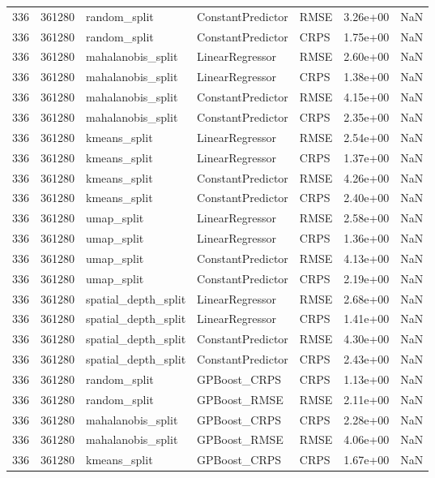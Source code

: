 \begin{tabular}{rrlllrr}
336 & 361280 & random\_split & ConstantPredictor & RMSE & 3.26e+00 & NaN \\
336 & 361280 & random\_split & ConstantPredictor & CRPS & 1.75e+00 & NaN \\
336 & 361280 & mahalanobis\_split & LinearRegressor & RMSE & 2.60e+00 & NaN \\
336 & 361280 & mahalanobis\_split & LinearRegressor & CRPS & 1.38e+00 & NaN \\
336 & 361280 & mahalanobis\_split & ConstantPredictor & RMSE & 4.15e+00 & NaN \\
336 & 361280 & mahalanobis\_split & ConstantPredictor & CRPS & 2.35e+00 & NaN \\
336 & 361280 & kmeans\_split & LinearRegressor & RMSE & 2.54e+00 & NaN \\
336 & 361280 & kmeans\_split & LinearRegressor & CRPS & 1.37e+00 & NaN \\
336 & 361280 & kmeans\_split & ConstantPredictor & RMSE & 4.26e+00 & NaN \\
336 & 361280 & kmeans\_split & ConstantPredictor & CRPS & 2.40e+00 & NaN \\
336 & 361280 & umap\_split & LinearRegressor & RMSE & 2.58e+00 & NaN \\
336 & 361280 & umap\_split & LinearRegressor & CRPS & 1.36e+00 & NaN \\
336 & 361280 & umap\_split & ConstantPredictor & RMSE & 4.13e+00 & NaN \\
336 & 361280 & umap\_split & ConstantPredictor & CRPS & 2.19e+00 & NaN \\
336 & 361280 & spatial\_depth\_split & LinearRegressor & RMSE & 2.68e+00 & NaN \\
336 & 361280 & spatial\_depth\_split & LinearRegressor & CRPS & 1.41e+00 & NaN \\
336 & 361280 & spatial\_depth\_split & ConstantPredictor & RMSE & 4.30e+00 & NaN \\
336 & 361280 & spatial\_depth\_split & ConstantPredictor & CRPS & 2.43e+00 & NaN \\
336 & 361280 & random\_split & GPBoost\_CRPS & CRPS & 1.13e+00 & NaN \\
336 & 361280 & random\_split & GPBoost\_RMSE & RMSE & 2.11e+00 & NaN \\
336 & 361280 & mahalanobis\_split & GPBoost\_CRPS & CRPS & 2.28e+00 & NaN \\
336 & 361280 & mahalanobis\_split & GPBoost\_RMSE & RMSE & 4.06e+00 & NaN \\
336 & 361280 & kmeans\_split & GPBoost\_CRPS & CRPS & 1.67e+00 & NaN \\

\end{tabular}
